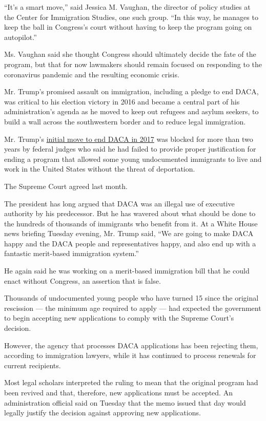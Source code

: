 ``It's a smart move,'' said Jessica M. Vaughan, the director of policy
studies at the Center for Immigration Studies, one such group. ``In this
way, he manages to keep the ball in Congress's court without having to
keep the program going on autopilot.''

Ms. Vaughan said she thought Congress should ultimately decide the fate
of the program, but that for now lawmakers should remain focused on
responding to the coronavirus pandemic and the resulting economic
crisis.

Mr. Trump's promised assault on immigration, including a pledge to end
DACA, was critical to his election victory in 2016 and became a central
part of his administration's agenda as he moved to keep out refugees and
asylum seekers, to build a wall across the southwestern border and to
reduce legal immigration.

Mr. Trump's
\href{https://www.nytimes.com/2017/09/05/us/politics/trump-daca-dreamers-immigration.html}{initial
move to end DACA in 2017} was blocked for more than two years by federal
judges who said he had failed to provide proper justification for ending
a program that allowed some young undocumented immigrants to live and
work in the United States without the threat of deportation.

The Supreme Court agreed last month.

The president has long argued that DACA was an illegal use of executive
authority by his predecessor. But he has wavered about what should be
done to the hundreds of thousands of immigrants who benefit from it. At
a White House news briefing Tuesday evening, Mr. Trump said, ``We are
going to make DACA happy and the DACA people and representatives happy,
and also end up with a fantastic merit-based immigration system.''

He again said he was working on a merit-based immigration bill that he
could enact without Congress, an assertion that is false.

Thousands of undocumented young people who have turned 15 since the
original rescission --- the minimum age required to apply --- had
expected the government to begin accepting new applications to comply
with the Supreme Court's decision.

However, the agency that processes DACA applications has been rejecting
them, according to immigration lawyers, while it has continued to
process renewals for current recipients.

Most legal scholars interpreted the ruling to mean that the original
program had been revived and that, therefore, new applications must be
accepted. An administration official said on Tuesday that the memo
issued that day would legally justify the decision against approving new
applications.

